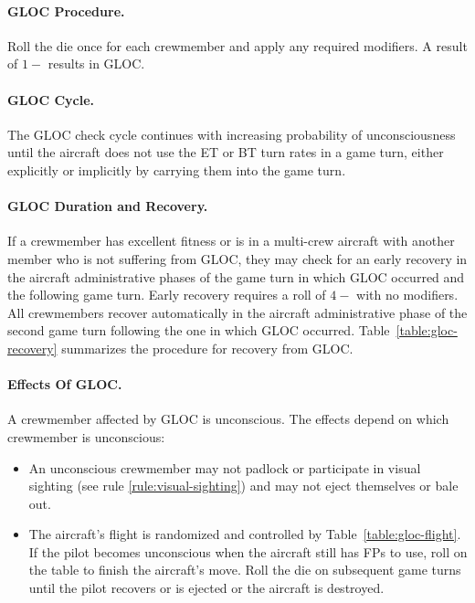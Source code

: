\begin{advancedrules}
{

\paragraph{GLOC Procedure.} 
Roll the die once for each crewmember and apply any required modifiers. A result of $1-$ results in GLOC. 

\paragraph{GLOC Cycle.} The GLOC check cycle continues with increasing probability of unconsciousness until the aircraft does not use the ET or BT turn rates in a game turn, either explicitly or implicitly by carrying them into the game turn.

\paragraph{GLOC Duration and Recovery.}

If a crewmember has excellent fitness or is in a multi-crew aircraft with another member who is not suffering from GLOC, they may check for an early recovery in the aircraft administrative phases of the game turn in which GLOC occurred and the following game turn. Early recovery requires a roll of $4-$ with no modifiers. All crewmembers recover automatically in the aircraft administrative phase of the second game turn following the one in which GLOC occurred. Table~\ref{table:gloc-recovery} summarizes the procedure for recovery from GLOC.

\paragraph{Effects Of GLOC.} 

A crewmember affected by GLOC is unconscious. The effects depend on which crewmember is unconscious:

\begin{itemize}

    \item{} An unconscious crewmember may not padlock or participate in visual sighting (see rule \ref{rule:visual-sighting}) and may not eject themselves or bale out.

    \item{} The aircraft's flight is randomized and controlled by Table~\ref{table:gloc-flight}. If the pilot becomes unconscious when the aircraft still has FPs to use, roll on the table to finish the aircraft's move. Roll the die on subsequent game turns until the pilot recovers or is ejected or the aircraft is destroyed.


\end{itemize}}
\end{advancedrules}

